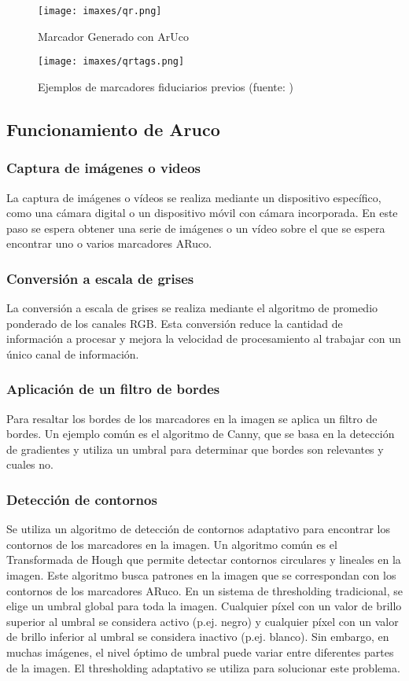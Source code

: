 \begin{figure}
  \centering
  \texttt{[image: imaxes/qr.png]}
  \caption{Marcador Generado con ArUco}
  \label{fig:qr}
\end{figure}

\begin{figure}
  \centering
  \texttt{[image: imaxes/qrtags.png]}
  \caption{Ejemplos de marcadores fiduciarios previos (fuente: \cite{GarridoJurado2014})}
  \label{fig:qrtags}
\end{figure}

\subsection{Funcionamiento de Aruco}

\subsubsection*{Captura de imágenes o videos}
La captura de imágenes o vídeos se realiza mediante un dispositivo específico, como una cámara digital o un dispositivo móvil con cámara incorporada. En este paso se espera obtener una serie de imágenes o un vídeo sobre el que se espera encontrar uno o varios marcadores ARuco.
\subsubsection*{Conversión a escala de grises}
La conversión a escala de grises se realiza mediante el algoritmo de promedio ponderado de los canales RGB. Esta conversión reduce la cantidad de información a procesar y mejora la velocidad de procesamiento al trabajar con un único canal de información.
\subsubsection*{Aplicación de un filtro de bordes}
Para resaltar los bordes de los marcadores en la imagen se aplica un filtro de bordes. Un ejemplo común es el algoritmo de Canny, que se basa en la detección de gradientes y utiliza un umbral para determinar que bordes son relevantes y cuales no.
\subsubsection*{Detección de contornos}
Se utiliza un algoritmo de detección de contornos adaptativo para encontrar los contornos de los marcadores en la imagen. Un algoritmo común es el Transformada de Hough que permite detectar contornos circulares y lineales en la imagen. Este algoritmo busca patrones en la imagen que se correspondan con los contornos de los marcadores ARuco.
En un sistema de thresholding tradicional, se elige un umbral global para toda la imagen. Cualquier píxel con un valor de brillo superior al umbral se considera activo (p.ej. negro) y cualquier píxel con un valor de brillo inferior al umbral se considera inactivo (p.ej. blanco). Sin embargo, en muchas imágenes, el nivel óptimo de umbral puede variar entre diferentes partes de la imagen. El thresholding adaptativo se utiliza para solucionar este problema.

